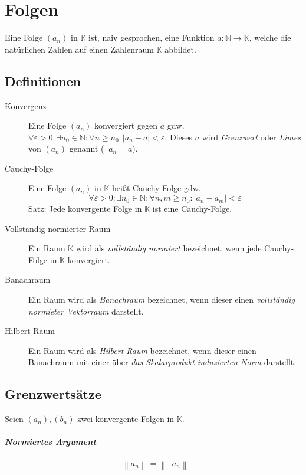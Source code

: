 \documentclass[a4paper, 11pt, accentcolor = tud3b]{tudreport}
\DeclareMathOperator{\liminfty}{\lim _ { n \rightarrow \infty }}
\newcommand{\norm}[1]{\left \lVert #1 \right \rVert}
\newcommand{\abs}[1]{\lvert #1 \rvert}
\begin{document}
    \chapter{Folgen}
        Eine Folge $ (a _ n) $ in $ \mathbb{K} $ ist, naiv gesprochen, eine Funktion $ a : \mathbb{N} \rightarrow \mathbb{K} $, welche die natürlichen Zahlen auf einen Zahlenraum $ \mathbb{K} $ abbildet.

        \section{Definitionen}
            \begin{description}
                \item[Konvergenz] Eine Folge $ (a _ n) $ konvergiert gegen $ a $ gdw. $ \forall \varepsilon > 0 : \exists n _ 0 \in \mathbb{N} : \forall n \geq n _ 0 : \lvert a _ n - a \rvert < \varepsilon $. Dieses $ a $ wird \textit{Grenzwert} oder \textit{Limes} von $ (a _ n) $ genannt ($ \liminfty a _ n = a $).
                \item[Cauchy-Folge] Eine Folge $ (a _ n) $ in $ \mathbb{K} $ heißt Cauchy-Folge gdw. \[ \forall \varepsilon > 0 : \exists n _ 0 \in \mathbb{N} : \forall n, m \geq n _ 0 : \abs{a _ n - a _ m} < \varepsilon \] Satz: Jede konvergente Folge in $ \mathbb{K} $ ist eine Cauchy-Folge.
                \item[Vollständig normierter Raum] Ein Raum $ \mathbb{K} $ wird als \textit{vollständig normiert} bezeichnet, wenn jede Cauchy-Folge in $ \mathbb{K} $ konvergiert.
                \item[Banachraum] Ein Raum wird als \textit{Banachraum} bezeichnet, wenn dieser einen \textit{vollständig normieter Vektorraum} darstellt.
                \item[Hilbert-Raum] Ein Raum wird als \textit{Hilbert-Raum} bezeichnet, wenn dieser einen Banachraum mit einer über \textit{das Skalarprodukt induzierten Norm} darstellt.
            \end{description}

        \section{Grenzwertsätze}
            Seien $ (a _ n), (b _ n) $ zwei konvergente Folgen in $ \mathbb{K} $.

            \paragraph{Normiertes Argument}
                \[ \liminfty \norm{a _ n} = \norm{\liminfty a _ n} \]
\end{document}
